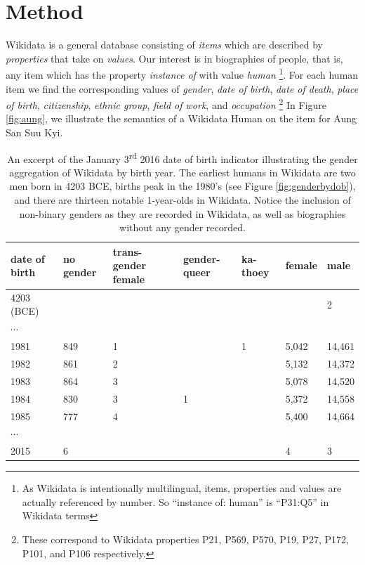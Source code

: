 \documentclass{sig-alternate-05-2015}
\begin{document}
\section{Method}

Wikidata is a general database consisting of \textit{items} which are described by \textit{properties} that take on \textit{values}. Our interest is in biographies of people, that is, any item which has the property \textit{instance of} with value \textit{human} \footnote{As Wikidata is intentionally multilingual, items, properties and values are actually referenced by number. So ``instance of: human'' is ``P31:Q5'' in Wikidata terms }. For each human item we find the corresponding values of \textit{gender}, \textit{date of birth}, \textit{date of death}, \textit{place of birth}, \textit{citizenship}, \textit{ethnic group}, \textit{field of work}, and \textit{occupation} \footnote{These correspond to Wikidata properties P21, P569, P570, P19, P27, P172, P101, and P106 respectively.} In Figure \ref{fig:aung}, we illustrate the semantics of a Wikidata Human on the item for Aung San Suu Kyi.
 
\begin{table}
\caption{An excerpt of the January 3\textsuperscript{rd} 2016 date of birth indicator illustrating the gender aggregation of Wikidata by birth year. The earliest humans in Wikidata are two men born in 4203 BCE, births peak in the 1980's (see Figure \ref{fig:genderbydob}), and there are thirteen notable 1-year-olds in Wikidata. Notice the inclusion of non-binary genders as they are recorded in Wikidata, as well as biographies without any gender recorded.}
\begin{tabular} {p{0.75cm}p{0.75cm}p{0.75cm}p{0.75cm}p{0.75cm}p{0.75cm}p{0.75cm}}
\toprule
date of birth & no gender & trans-gender female & gender-queer & ka-thoey & female & male \\
\midrule
4203 \small{(BCE)} & & & & & & 2   \\ 
$\cdots$ &  &  &  & &  &    \\ 
1981 & 849 & 1 &  & 1 &5,042 & 14,461 \\ 
1982 & 861 & 2 &  & &5,132 & 14,372  \\ 
1983 & 864 & 3 &  & &5,078 & 14,520  \\ 
1984 & 830 & 3 & 1 & &5,372 & 14,558   \\ 
1985 & 777 & 4 &  & &5,400 & 14,664  \\ 
$\cdots$ &  &  &  & &  &    \\ 
2015 & 6 &  &  & & 4 & 3  \\ 
\bottomrule
\end{tabular}
\label{table:dob}
\end{table}
\end{document}
